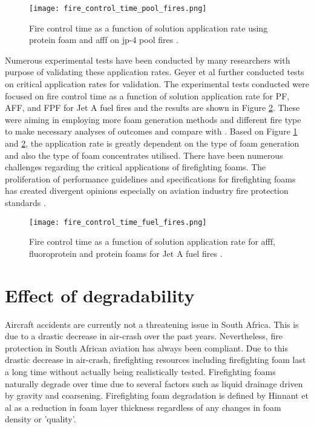 \begin{figure}[H]
    \centering
    \texttt{[image: fire\_control\_time\_pool\_fires.png]}
    \caption{Fire control time as a function of solution application rate using protein foam and \acrshort{afff} on \acrshort{jp-4} pool fires \cite{geyer1972evaluation}.}
    \label{ch2:figure:pool}
\end{figure}

Numerous experimental tests have been conducted by many researchers with purpose of validating these application rates. Geyer et al \cite{geyer1979comparative} further conducted tests on critical application rates for validation. The experimental tests conducted were focused on fire control time as a function of solution application rate for PF, AFF, and FPF for Jet A fuel fires and the results are shown in Figure \ref{ch2:figure:fuel}. These were aiming in employing more foam generation methods and different fire type to make necessary analyses of outcomes and compare with \cite{geyer1972evaluation}. Based on Figure \ref{ch2:figure:pool} and \ref{ch2:figure:fuel}, the application rate is greatly dependent on the type of foam generation and also the type of foam concentrates utilised. There have been numerous challenges regarding the critical applications of firefighting foams. The proliferation of performance guidelines and specifications for firefighting foams has created divergent opinions especially on aviation industry fire protection standards \cite{scheffey1995evaluating}.

\begin{figure}[H]
    \centering
    \texttt{[image: fire\_control\_time\_fuel\_fires.png]}
    \caption{Fire control time as a function of solution application rate for \acrshort{afff}, fluoroprotein and protein foams for Jet A fuel fires \cite{geyer1972evaluation}.}
    \label{ch2:figure:fuel}
\end{figure}

\section{Effect of degradability}
Aircraft accidents are currently not a threatening issue in South Africa. This is due to a drastic decrease in air-crash over the past years. Nevertheless, fire protection in South African aviation has always been compliant. Due to this drastic decrease in air-crash, firefighting resources including firefighting foam last a long time without actually being realistically tested. Firefighting foams naturally degrade over time due to several factors such as liquid drainage driven by gravity and coarsening. Firefighting foam degradation is defined by Hinnant et al \cite{hinnant2017influence} as a reduction in foam layer thickness regardless of any changes in foam density or 'quality'.

